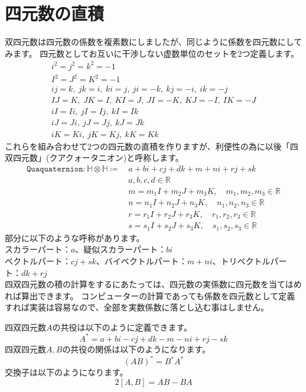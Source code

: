 \documentclass[a4paper,12pt,notitlepage]{jsreport}
\begin{document}
\section{四元数の直積}

双四元数は四元数の係数を複素数にしましたが、同じように係数を四元数にしてみます。
四元数としてお互いに干渉しない虚数単位のセットを2つ定義します。
\begin{gather}
  i^2=j^2=k^2=-1\\
  I^2=J^2=K^2=-1\\
  ij=k,~jk=i,~ki=j,~ji=-k,~kj=-i,~ik=-j\\
  IJ=K,~JK=I,~KI=J,~JI=-K,~KJ=-I,~IK=-J\\
  iI=Ii,~jI=Ij,~kI=Ik\\
  iJ=Ji,~jJ=Jj,~kJ=Jk\\
  iK=Ki,~jK=Kj,~kK=Kk
\end{gather}
これらを組み合わせて2つの四元数の直積を作りますが、利便性の為に以後「四双四元数」(クアクォータニオン)と呼称します。
\begin{equation}
  \begin{split}
    \texttt{Quaquaternion}:\mathbb{H}\otimes\mathbb{H}\coloneq ~&a+bi+cj+dk+m+ni+rj+sk\\
    &a,b,c,d\in\mathbb{R}\\
    &m=m_1I+m_2J+m_3K,\quad m_1,m_2,m_3\in\mathbb{R}\\
    &n=n_1I+n_2J+n_3K,\quad n_1,n_2,n_3\in\mathbb{R}\\
    &r=r_1I+r_2J+r_3K,\quad r_1,r_2,r_3\in\mathbb{R}\\
    &s=s_1I+s_2J+s_3K,\quad s_1,s_2,s_3\in\mathbb{R}
  \end{split}
\end{equation}
部分に以下のような呼称があります。\\
スカラーパート：$a$、疑似スカラーパート：$bi$\\
ベクトルパート：$cj+sk$、バイベクトルパート：$m+ni$、トリベクトルパート：$dk+rj$\\

四双四元数の積の計算をするにあたっては、四元数の実係数に四元数を当てはめれば算出できます。
コンピューターの計算であっても係数を四元数として定義すれば実装は容易なので、全部を実数係数に落とし込む事はしません。

四双四元数$A$の共役は以下のように定義できます。
\begin{equation}
  A^*=a+bi-cj+dk-m-ni+rj-sk
\end{equation}
四双四元数$A,B$の共役の関係は以下のようになります。
\begin{equation}
  (AB)^*=B^*A^*
\end{equation}
交換子は以下のようになります。
\begin{equation}
  2[A,B]=AB-BA
\end{equation}
\end{document}
